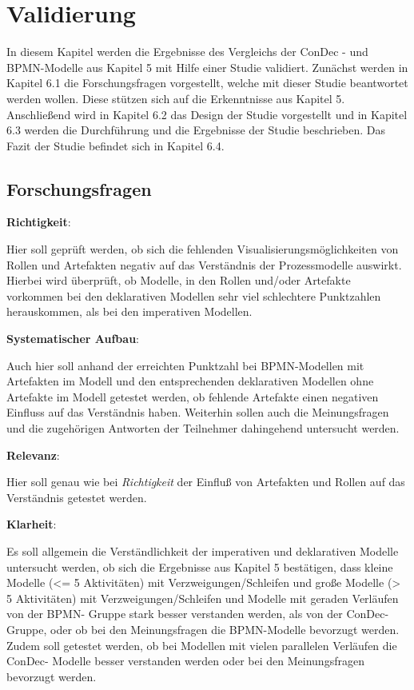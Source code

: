 \chapter{Validierung}\label{sec:chapter7}

In diesem Kapitel werden die Ergebnisse des Vergleichs der ConDec - und BPMN-Modelle aus Kapitel 5 mit Hilfe einer Studie validiert. Zunächst werden in Kapitel 6.1 die Forschungsfragen vorgestellt, welche mit dieser Studie beantwortet werden wollen. Diese stützen sich auf die Erkenntnisse aus Kapitel 5. Anschließend wird in Kapitel 6.2 das Design der Studie vorgestellt und in Kapitel 6.3 werden die Durchführung und die Ergebnisse der Studie beschrieben. Das Fazit der Studie befindet sich in Kapitel 6.4. \newline


\section{Forschungsfragen}

\textbf{Richtigkeit}: 


Hier soll geprüft werden, ob sich die fehlenden Visualisierungsmöglichkeiten von Rollen und Artefakten negativ auf das Verständnis der Prozessmodelle auswirkt. Hierbei wird überprüft, ob Modelle, in den Rollen und/oder Artefakte vorkommen bei den deklarativen Modellen sehr viel schlechtere Punktzahlen herauskommen, als bei den imperativen Modellen.\newline


\textbf{Systematischer Aufbau}: 


Auch hier soll anhand der erreichten Punktzahl bei BPMN-Modellen mit Artefakten im Modell und den entsprechenden deklarativen Modellen ohne Artefakte im Modell getestet werden, ob fehlende Artefakte einen negativen Einfluss auf das Verständnis haben. Weiterhin sollen auch die Meinungsfragen und die zugehörigen Antworten der Teilnehmer dahingehend untersucht werden.\newline

\textbf{Relevanz}: 

Hier soll genau wie bei \textit{Richtigkeit} der Einfluß von Artefakten und Rollen auf das Verständnis getestet werden.


\textbf{Klarheit}: 

Es soll allgemein die Verständlichkeit der imperativen und deklarativen Modelle untersucht werden, ob sich die Ergebnisse aus Kapitel 5 bestätigen, dass kleine Modelle (<= 5 Aktivitäten) mit Verzweigungen/Schleifen und große Modelle (> 5 Aktivitäten) mit Verzweigungen/Schleifen und Modelle mit geraden Verläufen von der BPMN- Gruppe stark besser verstanden werden, als von der ConDec- Gruppe, oder ob bei den Meinungsfragen die BPMN-Modelle bevorzugt werden. \newline
Zudem soll getestet werden, ob bei Modellen mit vielen parallelen Verläufen die ConDec- Modelle besser verstanden werden oder bei den Meinungsfragen bevorzugt werden.


